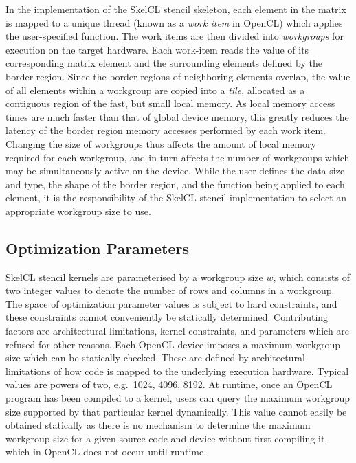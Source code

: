 \documentclass[nonatbib,preprint,nocopyrightspace,9pt]{sigplanconf}
\begin{document}
In the implementation of the SkelCL stencil skeleton, each element in
the matrix is mapped to a unique thread (known as a \emph{work item}
in OpenCL) which applies the user-specified function. The work items
are then divided into \emph{workgroups} for execution on the target
hardware. Each work-item reads the value of its corresponding matrix
element and the surrounding elements defined by the border
region. Since the border regions of neighboring elements overlap, the
value of all elements within a workgroup are copied into a
\emph{tile}, allocated as a contiguous region of the fast, but small
local memory. As local memory access times are much faster than that
of global device memory, this greatly reduces the latency of the
border region memory accesses performed by each work item. Changing
the size of workgroups thus affects the amount of local memory
required for each workgroup, and in turn affects the number of
workgroups which may be simultaneously active on the device. While the
user defines the data size and type, the shape of the border region,
and the function being applied to each element, it is the
responsibility of the SkelCL stencil implementation to select an
appropriate workgroup size to use.

\subsection{Optimization Parameters}\label{subsec:op-params}

SkelCL stencil kernels are parameterised by a workgroup size $w$,
which consists of two integer values to denote the number of rows and
columns in a workgroup. The space of optimization parameter values is
subject to hard constraints, and these constraints cannot conveniently
be statically determined. Contributing factors are architectural
limitations, kernel constraints, and parameters which are refused for
other reasons.  Each OpenCL device imposes a maximum workgroup size
which can be statically checked. These are defined by architectural
limitations of how code is mapped to the underlying execution
hardware. Typical values are powers of two, e.g.\ 1024, 4096, 8192. At
runtime, once an OpenCL program has been compiled to a kernel, users
can query the maximum workgroup size supported by that particular
kernel dynamically. This value cannot easily be obtained statically as
there is no mechanism to determine the maximum workgroup size for a
given source code and device without first compiling it, which in
OpenCL does not occur until runtime.
\end{document}
